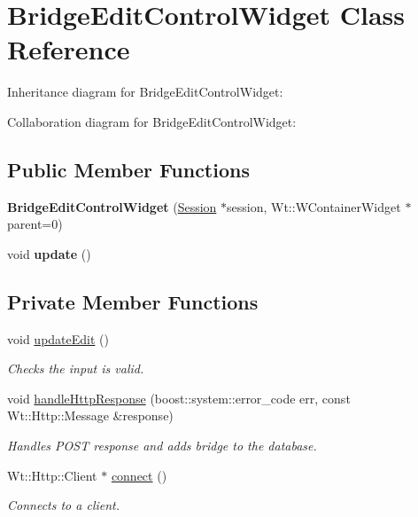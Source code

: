 \hypertarget{classBridgeEditControlWidget}{}\section{Bridge\+Edit\+Control\+Widget Class Reference}
\label{classBridgeEditControlWidget}


Inheritance diagram for Bridge\+Edit\+Control\+Widget\+:


Collaboration diagram for Bridge\+Edit\+Control\+Widget\+:
\subsection*{Public Member Functions}
\begin{DoxyCompactItemize}
\item 
{\bfseries Bridge\+Edit\+Control\+Widget} (\hyperlink{classSession}{Session} $\ast$session, Wt\+::\+W\+Container\+Widget $\ast$parent=0)\hypertarget{classBridgeEditControlWidget_af73b22c695986221080d97c284abcc3d}{}\label{classBridgeEditControlWidget_af73b22c695986221080d97c284abcc3d}

\item 
void {\bfseries update} ()\hypertarget{classBridgeEditControlWidget_adfc2d1340509848cfafa43ce78a39ed7}{}\label{classBridgeEditControlWidget_adfc2d1340509848cfafa43ce78a39ed7}

\end{DoxyCompactItemize}
\subsection*{Private Member Functions}
\begin{DoxyCompactItemize}
\item 
void \hyperlink{classBridgeEditControlWidget_a849d07b9de5032490034e53365a9e785}{update\+Edit} ()
\begin{DoxyCompactList}\small\item\em Checks the input is valid. \end{DoxyCompactList}\item 
void \hyperlink{classBridgeEditControlWidget_ab52c1124ffe350983915d42b8eb382bf}{handle\+Http\+Response} (boost\+::system\+::error\+\_\+code err, const Wt\+::\+Http\+::\+Message \&response)
\begin{DoxyCompactList}\small\item\em Handles P\+O\+ST response and adds bridge to the database. \end{DoxyCompactList}\item 
Wt\+::\+Http\+::\+Client $\ast$ \hyperlink{classBridgeEditControlWidget_a1b3d3198b0bbd5531e67df562b16bdc7}{connect} ()
\begin{DoxyCompactList}\small\item\em Connects to a client. \end{DoxyCompactList}\end{DoxyCompactItemize}
